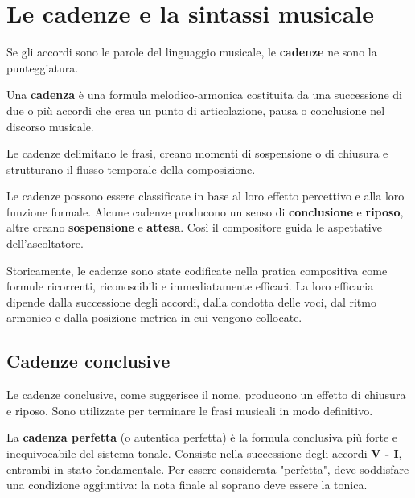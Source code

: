 	\chapter{Le cadenze e la sintassi musicale}
	\label{chap:cadenze}
	
	Se gli accordi sono le parole del linguaggio musicale, le \textbf{cadenze} ne sono la punteggiatura. 
		
\begin{definizione}[La Cadenza]
	\label{def:cadenza}
	Una \textbf{cadenza} è una formula melodico-armonica costituita da una successione di due o più accordi che crea un punto di articolazione, pausa o conclusione nel discorso musicale.
\end{definizione}

Le cadenze delimitano le frasi, creano momenti di sospensione o di chiusura e strutturano il flusso temporale della composizione.

Le cadenze possono essere classificate in base al loro effetto percettivo e alla loro funzione formale. Alcune cadenze producono un senso di \textbf{conclusione} e \textbf{riposo}, altre creano \textbf{sospensione} e \textbf{attesa}. Così il compositore guida le aspettative dell'ascoltatore.

Storicamente, le cadenze sono state codificate nella pratica compositiva come formule ricorrenti, riconoscibili e immediatamente efficaci. La loro efficacia dipende dalla successione degli accordi, dalla condotta delle voci, dal ritmo armonico e dalla posizione metrica in cui vengono collocate.
	
	\section{Cadenze conclusive}
	\label{sec:cadenze_conclusive}
	
	Le cadenze conclusive, come suggerisce il nome, producono un effetto di chiusura e riposo. Sono utilizzate per terminare le frasi musicali in modo definitivo.
	
	\begin{definizione}
		\label{def:cadenza_perfetta}
		La \textbf{cadenza perfetta} (o autentica perfetta) è la formula conclusiva più forte e inequivocabile del sistema tonale. Consiste nella successione degli accordi \textbf{V - I}, entrambi in stato fondamentale. Per essere considerata "perfetta", deve soddisfare una condizione aggiuntiva: la nota finale al soprano deve essere la tonica.
	\end{definizione}
	
